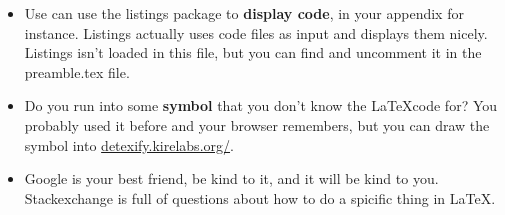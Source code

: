 \documentclass[thesis]{subfiles}
\begin{document}
\begin{itemize}
\item Use can use the listings package to \textbf{display code}, in your appendix for instance. Listings actually uses code files as input and displays them nicely. Listings isn't loaded in this file, but you can find and uncomment it in the preamble.tex file.

\item Do you run into some \textbf{symbol} that you don't know the \LaTeX code for? You probably used it before and your browser remembers, but you can draw the symbol into \url{detexify.kirelabs.org/}.

\item Google is your best friend, be kind to it, and it will be kind to you. Stackexchange is full of questions about how to do a spicific thing in \LaTeX.
\end{itemize}
\end{document}
